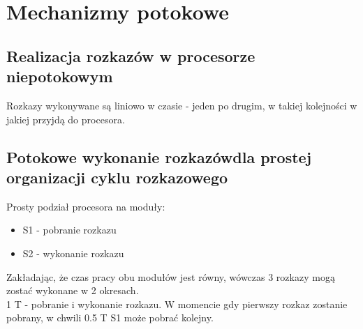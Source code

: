 \documentclass[a4paper,twoside]{article}
\begin{document}
	    
	\pagebreak
	\section*{Mechanizmy potokowe}
		\subsection*{Realizacja rozkazów w procesorze niepotokowym}
		Rozkazy wykonywane są liniowo w czasie - jeden po drugim, w takiej kolejności w jakiej przyjdą do procesora.
    	\subsection*{Potokowe wykonanie rozkazówdla prostej organizacji cyklu rozkazowego}
    	Prosty podział procesora na moduły:
    	\begin{itemize}
    		\item S1 - pobranie rozkazu
    		\item S2 - wykonanie rozkazu
    	\end{itemize}
    	Zakładając, że czas pracy obu modułów jest równy, wówczas 3 rozkazy mogą zostać wykonane w 2 okresach.\\
    	1 T - pobranie i wykonanie rozkazu. W momencie gdy pierwszy rozkaz zostanie pobrany, w chwili 0.5 T S1 może pobrać kolejny.
\end{document}
